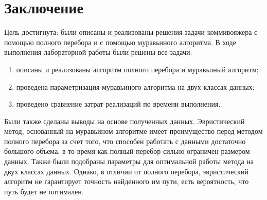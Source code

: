 \chapter*{Заключение}

Цель достигнута: были описаны и реализованы решения задачи коммивояжера с помощью полного перебора и с помощью муравьиного алгоритма.
В ходе выполнения лабораторной работы были решены все задачи:
\begin{enumerate}
	\item описаны и реализованы алгоритм полного перебора и муравьиный алгоритм;
	\item проведена параметризация муравьиного алгоритма на двух классах данных;
	\item проведено сравнение затрат реализаций по времени выполнения.
\end{enumerate}

Были также сделаны выводы на основе полученных данных.
Эвристический метод, основанный на муравьином алгоритме имеет преимущество перед методом полного перебора за счет того, что способен работать с данными достаточно большого объема, в то время как полный перебор сильно ограничен размером данных.
Также были подобраны параметры для оптимальной работы метода на двух классах данных.
Однако, в отличии от полного перебора, эвристический алгоритм не гарантирует точность найденного им пути, есть вероятность, что путь будет не оптимален.



